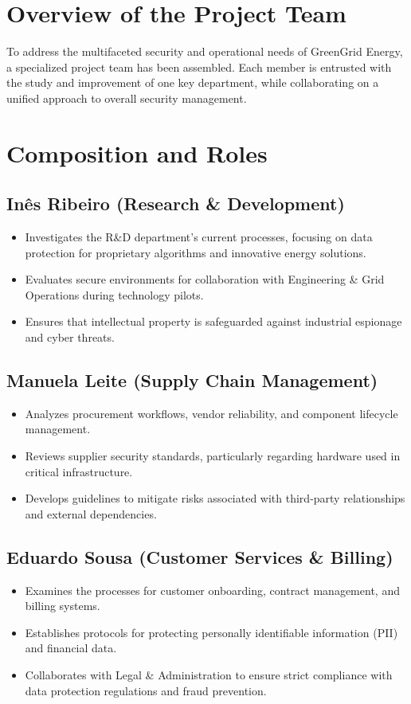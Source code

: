 \section{Overview of the Project Team}
To address the multifaceted security and operational needs of GreenGrid Energy, a specialized project team has been assembled. Each member is entrusted with the study and improvement of one key department, while collaborating on a unified approach to overall security management.

\section{Composition and Roles}

\subsection*{Inês Ribeiro \quad (Research \& Development)}
\begin{itemize}
    \item Investigates the R\&D department’s current processes, focusing on data protection for proprietary algorithms and innovative energy solutions.
    \item Evaluates secure environments for collaboration with Engineering \& Grid Operations during technology pilots.
    \item Ensures that intellectual property is safeguarded against industrial espionage and cyber threats.
\end{itemize}

\subsection*{Manuela Leite \quad (Supply Chain Management)}
\begin{itemize}
    \item Analyzes procurement workflows, vendor reliability, and component lifecycle management.
    \item Reviews supplier security standards, particularly regarding hardware used in critical infrastructure.
    \item Develops guidelines to mitigate risks associated with third-party relationships and external dependencies.
\end{itemize}

\subsection*{Eduardo Sousa \quad (Customer Services \& Billing)}
\begin{itemize}
    \item Examines the processes for customer onboarding, contract management, and billing systems.
    \item Establishes protocols for protecting personally identifiable information (PII) and financial data.
    \item Collaborates with Legal \& Administration to ensure strict compliance with data protection regulations and fraud prevention.
\end{itemize}
